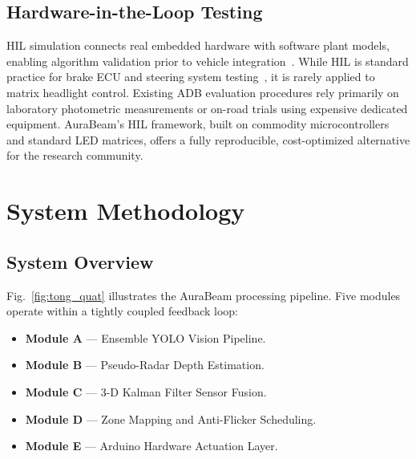 \documentclass{jstarticle}
\theoremstyle{remark}
\begin{document}
\subsection{Hardware-in-the-Loop Testing}
\label{subsec:hil}

HIL simulation connects real embedded hardware with software plant
models, enabling algorithm validation prior to vehicle
integration~\cite{Kalman1960}. While HIL is standard practice
for brake ECU and steering system testing~\cite{Short2005HIL}, it is
rarely applied to matrix headlight control. Existing ADB evaluation
procedures rely primarily on laboratory photometric measurements or
on-road trials using expensive dedicated equipment. AuraBeam's HIL
framework, built on commodity microcontrollers and standard LED
matrices, offers a fully reproducible, cost-optimized alternative
for the research community.

\section{System Methodology}
\label{sec:method}

\subsection{System Overview}
\label{subsec:overview}

Fig.~\ref{fig:tong_quat} illustrates the AuraBeam processing pipeline.
Five modules operate within a tightly coupled feedback loop:

\begin{itemize}
    \item \textbf{Module A} --- Ensemble YOLO Vision Pipeline.
    \item \textbf{Module B} --- Pseudo-Radar Depth Estimation.
    \item \textbf{Module C} --- 3-D Kalman Filter Sensor Fusion.
    \item \textbf{Module D} --- Zone Mapping and Anti-Flicker Scheduling.
    \item \textbf{Module E} --- Arduino Hardware Actuation Layer.
\end{itemize}
\end{document}
